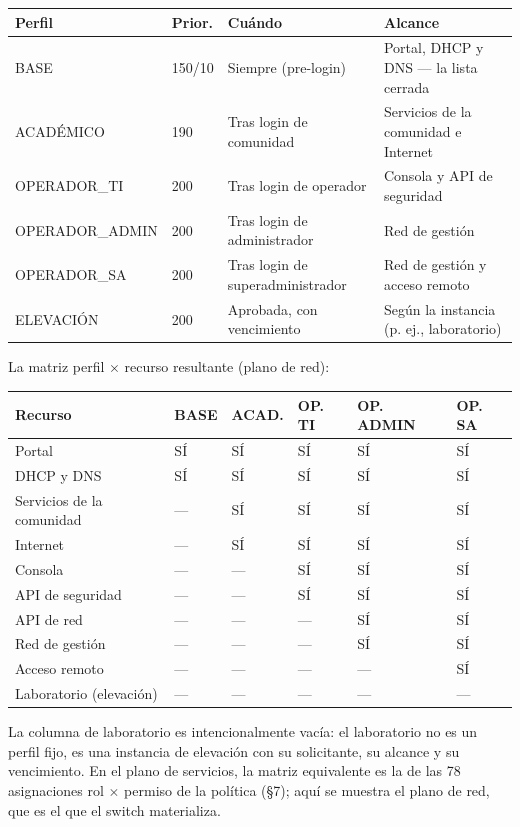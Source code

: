 \documentclass[11pt,a4paper]{article}
\begin{document}
\begin{longtable}{p{3.6cm}p{1.8cm}p{3.0cm}p{5.6cm}}
\toprule
\textbf{Perfil} & \textbf{Prior.} & \textbf{Cuándo} & \textbf{Alcance}\\
\midrule
BASE & 150/10 & Siempre (pre-login) & Portal, DHCP y DNS --- la lista cerrada\\
ACADÉMICO & 190 & Tras login de comunidad & Servicios de la comunidad e Internet\\
OPERADOR\_TI & 200 & Tras login de operador & Consola y API de seguridad\\
OPERADOR\_ADMIN & 200 & Tras login de administrador & Red de gestión\\
OPERADOR\_SA & 200 & Tras login de superadministrador & Red de gestión y acceso remoto\\
ELEVACIÓN & 200 & Aprobada, con vencimiento & Según la instancia (p. ej., laboratorio)\\
\bottomrule
\end{longtable}

La matriz perfil $\times$ recurso resultante (plano de red):

\begin{longtable}{p{3.4cm}p{2.2cm}p{2.4cm}p{2.4cm}p{2.4cm}p{2.2cm}}
\toprule
\textbf{Recurso} & \textbf{BASE} & \textbf{ACAD.} & \textbf{OP. TI} & \textbf{OP. ADMIN} & \textbf{OP. SA}\\
\midrule
Portal & SÍ & SÍ & SÍ & SÍ & SÍ\\
DHCP y DNS & SÍ & SÍ & SÍ & SÍ & SÍ\\
Servicios de la comunidad & --- & SÍ & SÍ & SÍ & SÍ\\
Internet & --- & SÍ & SÍ & SÍ & SÍ\\
Consola & --- & --- & SÍ & SÍ & SÍ\\
API de seguridad & --- & --- & SÍ & SÍ & SÍ\\
API de red & --- & --- & --- & SÍ & SÍ\\
Red de gestión & --- & --- & --- & SÍ & SÍ\\
Acceso remoto & --- & --- & --- & --- & SÍ\\
Laboratorio (elevación) & --- & --- & --- & --- & ---\\
\bottomrule
\end{longtable}

La columna de laboratorio es intencionalmente vacía: el laboratorio no es un perfil fijo, es una instancia de elevación con su solicitante, su alcance y su vencimiento. En el plano de servicios, la matriz equivalente es la de las 78 asignaciones rol $\times$ permiso de la política (§7); aquí se muestra el plano de red, que es el que el switch materializa.
\end{document}
